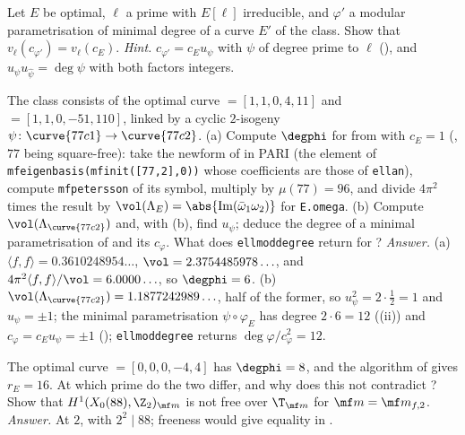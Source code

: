 \begin{exercise}\label{ex:moddeg:ex-manin-class}
Let $E$ be optimal, $\ell$ a prime with $E[\ell]$ irreducible, and $\varphi'$ a modular parametrisation of minimal degree of a curve $E'$ of the class. Show that $v_\ell(c_{\varphi'})=v_\ell(c_E)$.
\emph{Hint.} $c_{\varphi'}=c_Eu_\psi$ with $\psi$ of degree prime to $\ell$ (), and $u_\psi u_{\hat\psi}=\deg\psi$ with both factors integers.
\end{exercise}

\begin{exercise}\label{ex:moddeg:ex-77c}
The class  consists of the optimal curve  $=[1,1,0,4,11]$ and  $=[1,1,0,-51,110]$, linked by a cyclic $2$-isogeny $\psi\colon\curve{77c1}\to\curve{77c2}$.
(a) Compute $\degphi$ for  from  with $c_E=1$ (, $77$ being square-free): take the newform of  in PARI (the element of
\texttt{mfeigenbasis(mfinit([77,2],0))} whose coefficients are those of \texttt{ellan}), compute \texttt{mfpetersson} of its symbol, multiply by $\mu(77)=96$, and divide $4\pi^2$ times the result by
$\vol(\Lambda_E)=\abs{\operatorname{Im}(\bar\omega_1\omega_2)}$ for \texttt{E.omega}. (b) Compute $\vol(\Lambda_{\curve{77c2}})$ and, with (b), find $u_\psi$; deduce the degree of a minimal
parametrisation of  and its $c_\varphi$. What does \texttt{ellmoddegree} return for ?
\emph{Answer.} (a) $\langle f,f\rangle=0.3610248954\ldots$, $\vol=2.3754485978\ldots$, and $4\pi^2\langle f,f\rangle/\vol=6.0000\ldots$, so $\degphi=6$. (b) $\vol(\Lambda_{\curve{77c2}})=1.1877242989\ldots$, half of the
former, so $u_\psi^2=2\cdot\frac12=1$ and $u_\psi=\pm1$; the minimal parametrisation $\psi\circ\varphi_E$ has degree $2\cdot6=12$ ((ii)) and $c_\varphi=c_Eu_\psi=\pm1$
(); \texttt{ellmoddegree} returns $\deg\varphi/c_\varphi^2=12$.
\end{exercise}

\begin{exercise}\label{ex:moddeg:ex-88}
The optimal curve  $=[0,0,0,-4,4]$ has $\degphi=8$, and the algorithm of  gives $r_E=16$. At which prime do the two differ, and why does this not contradict
? Show that $H^1(X_0(88),\Z_2)_{\mf m}$ is not free over $\T_{\mf m}$ for $\mf m=\mf m_{f,2}$. \emph{Answer.} At $2$, with $2^2\mid88$; freeness would give equality in
.
\end{exercise}


